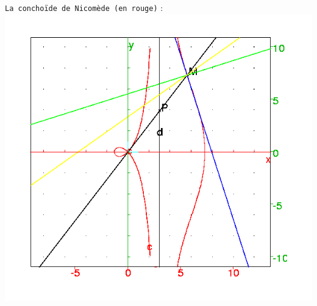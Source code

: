 \documentclass[a4paper,11pt]{book}
\begin{document}
{\tt La concho\"{i}de de Nicom\`ede (en rouge)} :\\
\includegraphics[width=\textwidth]{nicomede}
\end{document}
